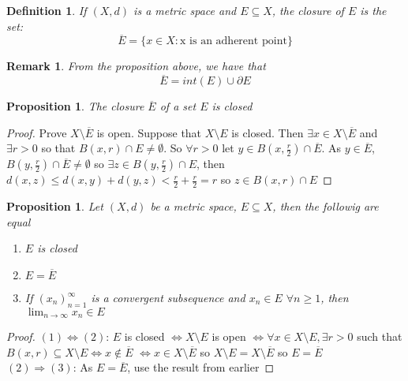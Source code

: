 \documentclass{article}
\newtheorem{definition}[theorem]{Definition}
\newtheorem{proposition}[theorem]{Proposition}
\newtheorem{remark}[theorem]{Remark}
\begin{document}
\begin{definition}
    If $(X,d)$ is a metric space and $E\subseteq X$, the closure of $E$ is the set:
    \begin{equation}
        \overline{E} = \{x \in X : \text{x is an adherent point}\}
    \end{equation}
\end{definition}
\begin{remark}
    From the proposition above, we have that
    \begin{equation}
        \overline{E} = int(E) \cup \partial E
    \end{equation}
\end{remark}

\begin{proposition}
    The closure $\overline{E}$ of a set $E$ is closed
\end{proposition}
\begin{proof}
    Prove $X \setminus \overline{E}$ is open. Suppose that $X \setminus E$ is closed.
    Then $\exists x \in X \setminus \overline{E}$ and $\exists r > 0$ so that
    $B(x,r) \cap E \not= \emptyset$. So $\forall r >  0$ let
    $y \in B(x, \frac{r}{2}) \cap \overline{E}$. As $y \in \overline{E}$,
    $B(y, \frac{r}{2}) \cap \overline{E} \not= \emptyset$ so
    $\exists z \in B(y, \frac{r}{2}) \cap E$, then
    $d(x,z) \leq d(x,y) + d(y,z) < \frac{r}{2} + \frac{r}{2} = r$ so
    $z \in B(x, r) \cap E$
\end{proof}

\begin{proposition}
    Let $(X,d)$ be a metric space, $E \subseteq X$, then the followig are equal
    \begin{enumerate}
        \item $E$ is closed
        \item $E = \overline{E}$
        \item If $(x_n)_{n=1}^{\infty}$ is a convergent subsequence and $x_n \in E$
            $\forall n \geq 1$, then $\lim_{n \to \infty} x_n \in E$
    \end{enumerate}
\end{proposition}
\begin{proof}
    $(1) \Leftrightarrow (2)$: $E$ is closed $\Leftrightarrow X \setminus E$ is open
    $\Leftrightarrow \forall x \in X \setminus E, \exists r > 0$ such that
    $B(x,r) \subseteq X \setminus E \Leftrightarrow x \not\in \overline{E}$
    $\Leftrightarrow x \in X \setminus \overline{E}$ so
    $X \setminus E = X \setminus \overline{E}$ so $E = \overline{E}$ \\
    $(2) \Rightarrow (3)$: As $E = \overline{E}$, use the result from earlier
\end{proof}
\end{document}
